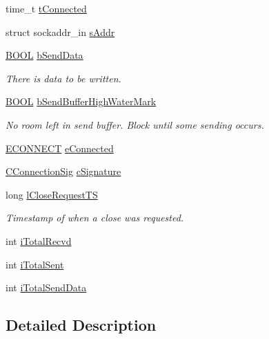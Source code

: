 \begin{DoxyCompactItemize}
\item 
time\-\_\-t \hyperlink{class_c_p_connection_a758401474fda32b364811b3ccbe2013f}{t\-Connected}
\item 
struct sockaddr\-\_\-in \hyperlink{class_c_p_connection_af5990e2eecbce8a899752e3f195c5cc1}{s\-Addr}
\item 
\hyperlink{_cpclient_8h_a3be13892ae7076009afcf121347dd319}{\-B\-O\-O\-L} \hyperlink{class_c_p_connection_ab1099445977c4cabbb67c86f6a0b9213}{b\-Send\-Data}
\begin{DoxyCompactList}\small\item\em \-There is data to be written. \end{DoxyCompactList}\item 
\hyperlink{_cpclient_8h_a3be13892ae7076009afcf121347dd319}{\-B\-O\-O\-L} \hyperlink{class_c_p_connection_a3f860ee09bae3ca5a8967f5d787d1f93}{b\-Send\-Buffer\-High\-Water\-Mark}
\begin{DoxyCompactList}\small\item\em \-No room left in send buffer. \-Block until some sending occurs. \end{DoxyCompactList}\item 
\hyperlink{class_c_p_connection_a0b9dfdba3bf3fb022507756c5eff7bde}{\-E\-C\-O\-N\-N\-E\-C\-T} \hyperlink{class_c_p_connection_a46c09912bcb9c4d96314030c5111ee66}{e\-Connected}
\item 
\hyperlink{class_c_connection_sig}{\-C\-Connection\-Sig} \hyperlink{class_c_p_connection_aa9f6fb20fce6e497615335f8eed8591c}{c\-Signature}
\item 
long \hyperlink{class_c_p_connection_aa267a7859ca43e74af4a62bbaaac3d63}{l\-Close\-Request\-T\-S}
\begin{DoxyCompactList}\small\item\em \-Timestamp of when a close was requested. \end{DoxyCompactList}\item 
int \hyperlink{class_c_p_connection_ad7ed8001aa54d09e57ce0fb19229d9c8}{i\-Total\-Recvd}
\item 
int \hyperlink{class_c_p_connection_a4c90b5b3376f330b9347b2f48dc80d0e}{i\-Total\-Sent}
\item 
int \hyperlink{class_c_p_connection_a1fb64ea875ecc8bc912bafd308294bf1}{i\-Total\-Send\-Data}
\end{DoxyCompactItemize}


\subsection{\-Detailed \-Description}


